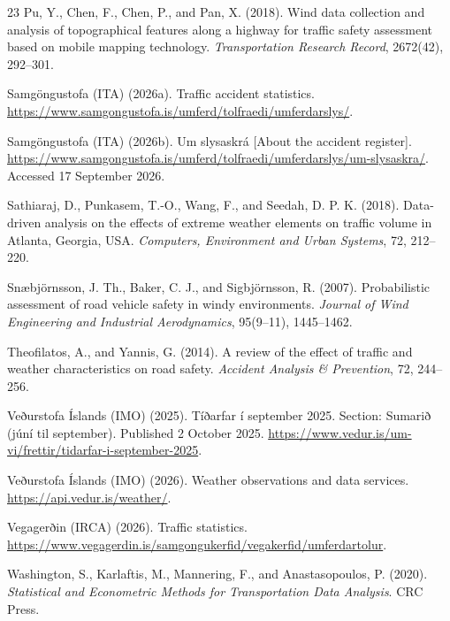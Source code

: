 \begin{thebibliography}{23}
Pu, Y., Chen, F., Chen, P., and Pan, X. (2018).
\newblock Wind data collection and analysis of topographical features along a
highway for traffic safety assessment based on mobile mapping technology.
\newblock \emph{Transportation Research Record}, 2672(42), 292--301.

Samgöngustofa (ITA) (2026a).
\newblock Traffic accident statistics.
\newblock \url{https://www.samgongustofa.is/umferd/tolfraedi/umferdarslys/}.

Samgöngustofa (ITA) (2026b).
\newblock Um slysaskrá [About the accident register].
\newblock \url{https://www.samgongustofa.is/umferd/tolfraedi/umferdarslys/um-slysaskra/}.
\newblock Accessed 17 September 2026.

Sathiaraj, D., Punkasem, T.-O., Wang, F., and Seedah, D. P. K. (2018).
\newblock Data-driven analysis on the effects of extreme weather elements on
traffic volume in Atlanta, Georgia, USA.
\newblock \emph{Computers, Environment and Urban Systems}, 72, 212--220.

Sn\ae bj\"ornsson, J. Th., Baker, C. J., and Sigbj\"ornsson, R. (2007).
\newblock Probabilistic assessment of road vehicle safety in windy environments.
\newblock \emph{Journal of Wind Engineering and Industrial Aerodynamics},
95(9--11), 1445--1462.

Theofilatos, A., and Yannis, G. (2014).
\newblock A review of the effect of traffic and weather characteristics on road safety.
\newblock \emph{Accident Analysis \& Prevention}, 72, 244--256.

Veðurstofa Íslands (IMO) (2025).
\newblock Tíðarfar í september 2025. Section: Sumarið (júní til september).
\newblock Published 2 October 2025.
\newblock \url{https://www.vedur.is/um-vi/frettir/tidarfar-i-september-2025}.

Veðurstofa Íslands (IMO) (2026).
\newblock Weather observations and data services.
\newblock \url{https://api.vedur.is/weather/}.

Vegagerðin (IRCA) (2026).
\newblock Traffic statistics.
\newblock \url{https://www.vegagerdin.is/samgongukerfid/vegakerfid/umferdartolur}.

Washington, S., Karlaftis, M., Mannering, F., and Anastasopoulos, P. (2020).
\newblock \emph{Statistical and Econometric Methods for Transportation Data Analysis}.
\newblock CRC Press.


\end{thebibliography}
